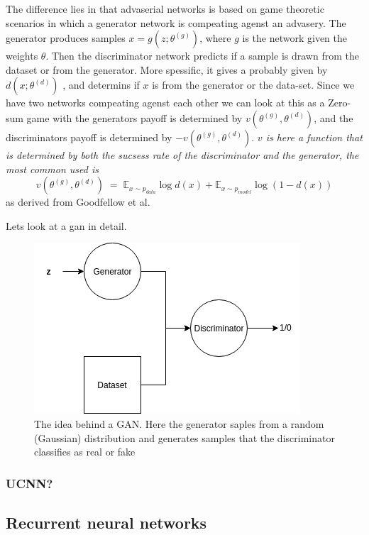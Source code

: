 	  The difference lies in that advaserial networks is based on game theoretic scenarios in which a generator network is compeating agenst an advasery. 
	  The generator produces samples $x=g(z;\theta^{(g)})$, where $g$ is the network given the weights $\theta$. Then the discriminator network predicts if a sample is drawn from the dataset or from the generator.
	  More spessific, it gives a probably given by $d(x;\theta^{(d)})$ , and determins if $x$ is from the generator or the data-set. 
	  Since we have two networks compeating agenst each other we can look at this as a Zero-sum game with the generators payoff is determined by $v(\theta^{(g)},\theta^{(d)})$, and the discriminators payoff is determined 
	  by $-v(\theta^{(g)},\theta^{(d)})$.
	  \textit{$v$ is here a function that is determined by both the sucsess rate of the discriminator and the generator, the most common used is}
	  \begin{equation}
	  v(\theta^{(g)},\theta^{(d)}) \; = \; \mathds{E}_{x\sim p_{data}}\log{d(x)} + \mathds{E}_{x\sim p_{model}}\log{(1 - d(x))} %
	  \end{equation}
	  as derived from Goodfellow et al. %
	  
	  Lets look at a gan in detail. \\
	  \begin{figure}[ht!]
	    \centering
	    \includegraphics[scale=0.5]{background/figures/simpleGAN.png}
	    \caption{The idea behind a GAN. Here the generator saples from a random (Gaussian) distribution and generates samples that the discriminator classifies as real or fake}
	\end{figure}
	
    \subsubsection{UCNN?}	
    \subsection{Recurrent neural networks}
